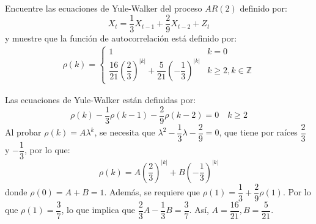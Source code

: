 

\addpoints
\question[20] Encuentre las ecuaciones de Yule-Walker del proceso $AR(2)$ definido por:
$$X_t=\dfrac{1}{3}X_{t-1}+\dfrac{2}{9}X_{t-2}+Z_t$$
y muestre que la función de autocorrelación está definido por:
\begin{align*}
\rho(k)=\begin{cases} 1 \quad &k=0 \\ \dfrac{16}{21}\left(\dfrac{2}{3}\right)^{|k|}+\dfrac{5}{21}\left(-\dfrac{1}{3}\right)^{|k|} &k\geq 2,k\in \mathbb{Z}\end{cases}
\end{align*}
\begin{solution}
Las ecuaciones de Yule-Walker están definidas por:
$$\rho(k)-\dfrac{1}{3}\rho(k-1)-\dfrac{2}{9}\rho(k-2)=0 \quad k\geq 2$$
Al probar $\rho(k)=A\lambda^{k}$, se necesita que $\lambda^2-\dfrac{1}{3}\lambda-\dfrac{2}{9}=0$, que tiene por raíces $\dfrac{2}{3}$ y $-\dfrac{1}{3}$, por lo que:
$$\rho(k)=A\left(\dfrac{2}{3}\right)^{|k|}+B\left(-\dfrac{1}{3}\right)^{|k|}$$
donde $\rho(0)=A+B=1$. Además, se requiere que $\rho(1)=\dfrac{1}{3}+\dfrac{2}{9}\rho(1)$. Por lo que $\rho(1)=\dfrac{3}{7}$, lo que implica que $\dfrac{2}{3}A-\dfrac{1}{3}B=\dfrac{3}{7}$. Así, $A=\dfrac{16}{21},B=\dfrac{5}{21}$.
\end{solution}